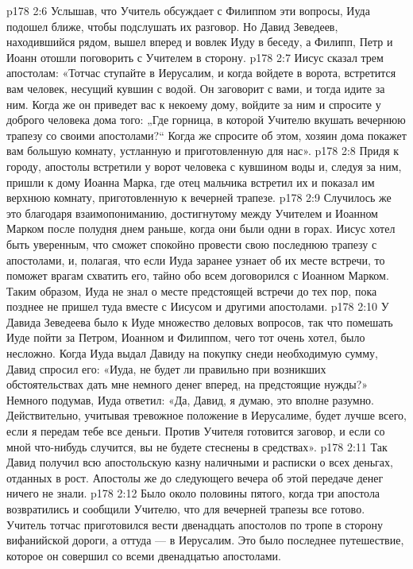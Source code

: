 \vs p178 2:6 Услышав, что Учитель обсуждает с Филиппом эти вопросы, Иуда подошел ближе, чтобы подслушать их разговор. Но Давид Зеведеев, находившийся рядом, вышел вперед и вовлек Иуду в беседу, а Филипп, Петр и Иоанн отошли поговорить с Учителем в сторону.
\vs p178 2:7 Иисус сказал трем апостолам: «Тотчас ступайте в Иерусалим, и когда войдете в ворота, встретится вам человек, несущий кувшин с водой. Он заговорит с вами, и тогда идите за ним. Когда же он приведет вас к некоему дому, войдите за ним и спросите у доброго человека дома того: „Где горница, в которой Учителю вкушать вечернюю трапезу со своими апостолами?“ Когда же спросите об этом, хозяин дома покажет вам большую комнату, устланную и приготовленную для нас».
\vs p178 2:8 Придя к городу, апостолы встретили у ворот человека с кувшином воды и, следуя за ним, пришли к дому Иоанна Марка, где отец мальчика встретил их и показал им верхнюю комнату, приготовленную к вечерней трапезе.
\vs p178 2:9 Случилось же это благодаря взаимопониманию, достигнутому между Учителем и Иоанном Марком после полудня днем раньше, когда они были одни в горах. Иисус хотел быть уверенным, что сможет спокойно провести свою последнюю трапезу с апостолами, и, полагая, что если Иуда заранее узнает об их месте встречи, то поможет врагам схватить его, тайно обо всем договорился с Иоанном Марком. Таким образом, Иуда не знал о месте предстоящей встречи до тех пор, пока позднее не пришел туда вместе с Иисусом и другими апостолами.
\vs p178 2:10 \pc У Давида Зеведеева было к Иуде множество деловых вопросов, так что помешать Иуде пойти за Петром, Иоанном и Филиппом, чего тот очень хотел, было несложно. Когда Иуда выдал Давиду на покупку снеди необходимую сумму, Давид спросил его: «Иуда, не будет ли правильно при возникших обстоятельствах дать мне немного денег вперед, на предстоящие нужды?» Немного подумав, Иуда ответил: «Да, Давид, я думаю, это вполне разумно. Действительно, учитывая тревожное положение в Иерусалиме, будет лучше всего, если я передам тебе все деньги. Против Учителя готовится заговор, и если со мной что\hyp{}нибудь случится, вы не будете стеснены в средствах».
\vs p178 2:11 Так Давид получил всю апостольскую казну наличными и расписки о всех деньгах, отданных в рост. Апостолы же до следующего вечера об этой передаче денег ничего не знали.
\vs p178 2:12 \pc Было около половины пятого, когда три апостола возвратились и сообщили Учителю, что для вечерней трапезы все готово. Учитель тотчас приготовился вести двенадцать апостолов по тропе в сторону вифанийской дороги, а оттуда --- в Иерусалим. Это было последнее путешествие, которое он совершил со всеми двенадцатью апостолами.
